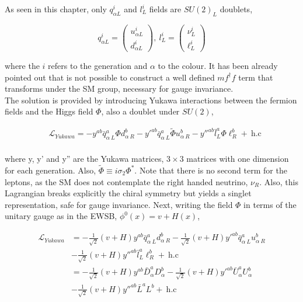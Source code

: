 As seen in this chapter, only $q_{\alpha L}^i$ and $l^i_L$ fields are $SU(2)_L$ doublets,

\begin{equation}
    \label{Theory_eq:SUdoublets}
    q_{\alpha L}^i=\begin{pmatrix} u^i_{\alpha L} \\ d^i_{\alpha L} \end{pmatrix},\ l_L^i = \begin{pmatrix} \nu^i_L \\ \ell^i_L \end{pmatrix}
\end{equation}

where the $i$ refers to the generation and $\alpha$ to the colour. It has been already pointed out that is not possible to construct a well defined $mf^\dag f$ term that transforms under the SM group, necessary for gauge invariance.\\

The solution is provided by introducing Yukawa interactions between the fermion fields and the Higgs field $\Phi$, also a doublet under $SU(2)$,

\begin{equation}
\begin{split}
    &\mathcal{L}_{Yukawa} = -y^{ab}\bar{q}^a_{\alpha\ L}\Phi d^b_{\alpha\ R} - y'^{ab}\bar{q}^a_{\alpha\ L}\tilde{\Phi} u^b_{\alpha\ R}-y''^{ab}\bar{l}^a_{L}\Phi \ell^b_{R}+\ \text{h.c}\\
\end{split}
\end{equation}

where y, y' and y'' are the Yukawa matrices, $3\times3$ matrices with one dimension for each generation. Also, $\tilde{\Phi}\equiv i\sigma_2\Phi^*$. Note that there is no second term for the leptons, as the SM does not contemplate the right handed neutrino, $\nu_R$. Also, this Lagrangian breaks explicitly the chiral symmetry but yields a singlet representation, safe for gauge invariance. Next, writing the field $\Phi$ in terms of the unitary gauge as in the EWSB, $\phi^0(x)=v+H(x)$,

\begin{equation}
\begin{split}
    \mathcal{L}_{Yukawa} &= -\frac{1}{\sqrt{2}}(v+H)y^{ab}\bar{q}^a_{\alpha\ L} d^b_{\alpha\ R} - \frac{1}{\sqrt{2}}(v+H)y'^{ab}\bar{q}^a_{\alpha\ L}u^b_{\alpha\ R}\\
    &-\frac{1}{\sqrt{2}}(v+H)y''^{ab}\bar{l}^a_{L}\ell^b_{R}+\ \text{h.c}\\
    &=-\frac{1}{\sqrt{2}}(v+H)y^{ab} \bar{D}^a_\alpha D^b_\alpha - \frac{1}{\sqrt{2}}(v+H)y'^{ab}\bar{U}^a_\alpha U^b_\alpha\\
    &-\frac{1}{\sqrt{2}}(v+H)y''^{ab}\bar{L}^a L^b+\ \text{h.c}
\end{split}
\end{equation}

